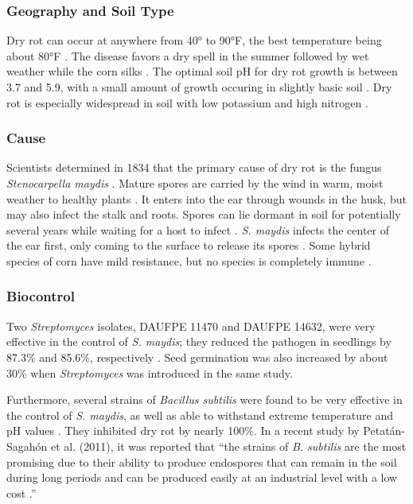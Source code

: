 \documentclass[12pt]{article}
\begin{document}
\subsubsection{Geography and Soil Type}

Dry rot can occur at anywhere from 40° to 90°F, the best temperature being about 80°F \autocite{melhus1922dry}. The disease favors a dry spell in the summer followed by wet weather while the corn silks \autocite{ullstrup1961corn, melhus1922dry}. The optimal soil pH for dry rot growth is between 3.7 and 5.9, with a small amount of growth occuring in slightly basic soil \autocite{eddins1930dry}. Dry rot is especially widespread in soil with low potassium and high nitrogen \autocite{ullstrup1961corn}.

\subsubsection{Cause}

Scientists determined in 1834 that the primary cause of dry rot is the fungus \emph{Stenocarpella maydis} \autocite{durrell1923dry, ullstrup1961corn}. Mature spores are carried by the wind in warm, moist weather to healthy plants \autocite{ullstrup1961corn}. It enters into the ear through wounds in the husk, but may also infect the stalk and roots. Spores can lie dormant in soil for potentially several years while waiting for a host to infect \autocite{eddins1930dry}. \emph{S. maydis} infects the center of the ear first, only coming to the surface to release its spores \autocite{melhus1922dry}. Some hybrid species of corn have mild resistance, but no species is completely immune \autocite{ullstrup1961corn}.

\subsubsection{Biocontrol}

Two \emph{Streptomyces} isolates, DAUFPE 11470 and DAUFPE 14632, were very effective in the control of \emph{S. maydis}; they reduced the pathogen in seedlings by 87.3\% and 85.6\%, respectively \autocite{bressan2005biological, bressan2003biological}. Seed germination was also increased by about 30\% when \emph{Streptomyces} was introduced in the same study.

Furthermore, several strains of \emph{Bacillus subtilis} were found to be very effective in the control of \emph{S. maydis}, as well as able to withstand extreme temperature and pH values \autocite{petatan2011isolation}. They inhibited dry rot by nearly 100\%. In a recent study by Petat{\'a}n-Sagah{\'o}n et al. (2011), it was reported that ``the strains of \emph{B. subtilis} are the most promising due to their ability to produce endospores that can remain
in the soil during long periods and can be produced easily at an industrial level with a low cost \autocite{stein2005bacillus}.''
\end{document}
